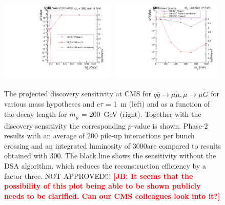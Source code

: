 \begin{figure}[t]\begin{center}
\includegraphics[width=0.49\textwidth]{figures/SignificanceComp.pdf}
\includegraphics[width=0.49\textwidth]{figures/SignificanceComp_asfuncofCtau.pdf}
\caption{The projected discovery sensitivity at CMS for  $q \bar q \to \widetilde{\mu} \widetilde{\mu}, \widetilde{\mu}\rightarrow \mu\widetilde{G}$ for various mass hypotheses and $c\tau$ = 1~m (left) and as a function of the decay length for $m_{\widetilde{\mu}}$ = 200~GeV (right). Together with the discovery sensitivity the corresponding $p$-value is shown. Phase-2 results with an average of 200 pile-up interactions per bunch crossing and an integrated luminosity of 3000\fbinv are compared to results obtained with 300\fbinv. The black line shows the sensitivity without the DSA algorithm, which reduces the reconstruction efficiency by a factor three. NOT APPROVED!!! {\bf \textcolor{red}{[JB: It seems that the possibility of this plot being able to be shown publicly needs to be clarified.  Can our CMS colleagues look into it?]}}
 }
\label{fig:displResultsSensitiviy}
\end{center}
\end{figure}

